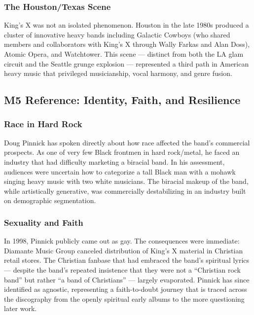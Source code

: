 \documentclass[11pt,letterpaper]{article}
\begin{document}
\subsubsection{The Houston/Texas Scene}

King's X was not an isolated phenomenon. Houston in the late 1980s produced a cluster of innovative heavy bands including Galactic Cowboys (who shared members and collaborators with King's X through Wally Farkas and Alan Doss), Atomic Opera, and Watchtower. This scene --- distinct from both the LA glam circuit and the Seattle grunge explosion --- represented a third path in American heavy music that privileged musicianship, vocal harmony, and genre fusion.

\subsection{M5 Reference: Identity, Faith, and Resilience}

\subsubsection{Race in Hard Rock}

Doug Pinnick has spoken directly about how race affected the band's commercial prospects. As one of very few Black frontmen in hard rock/metal, he faced an industry that had difficulty marketing a biracial band. In his assessment, audiences were uncertain how to categorize a tall Black man with a mohawk singing heavy music with two white musicians. The biracial makeup of the band, while artistically generative, was commercially destabilizing in an industry built on demographic segmentation.

\subsubsection{Sexuality and Faith}

In 1998, Pinnick publicly came out as gay. The consequences were immediate: Diamante Music Group canceled distribution of King's X material in Christian retail stores. The Christian fanbase that had embraced the band's spiritual lyrics --- despite the band's repeated insistence that they were not a ``Christian rock band'' but rather ``a band of Christians'' --- largely evaporated. Pinnick has since identified as agnostic, representing a faith-to-doubt journey that is traced across the discography from the openly spiritual early albums to the more questioning later work.
\end{document}
